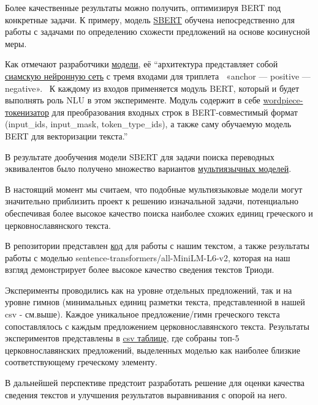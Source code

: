 \documentclass[
  letterpaper,
]{book}
\begin{document}
Более качественные результаты можно получить, оптимизируя BERT под
конкретные задачи. К примеру, модель
\href{https://arxiv.org/pdf/1908.10084.pdf}{SBERT} обучена
непосредственно для работы с задачами по определению схожести
предложений на основе косинусной меры.

Как отмечают разработчики
\href{https://habr.com/ru/companies/sberdevices/articles/527576/}{модели},
её ``архитектура представляет собой
\href{https://en.wikipedia.org/wiki/Siamese_neural_network}{сиамскую
нейронную сеть} с тремя входами для триплета~ «anchor --- positive ---
negative».~ К каждому из входов применяется модуль BERT, который и будет
выполнять роль NLU в этом эксперименте. Модуль содержит в себе
\href{https://paperswithcode.com/method/wordpiece}{wordpiece-токенизатор}
для преобразования входных строк в BERT-совместимый формат (input\_ids,
input\_mask, token\_type\_ids), а также саму обучаемую модель BERT для
векторизации текста.''

В результате дообучения модели SBERT для задачи поиска переводных
эквивалентов было получено множество вариантов
\href{https://huggingface.co/models?pipeline_tag=sentence-similarity\&sort=downloads\&search=multi}{мультиязычных
моделей}.

В настоящий момент мы считаем, что подобные мультиязыковые модели могут
значительно приблизить проект к решению изначальной задачи, потенциально
обеспечивая более высокое качество поиска наиболее схожих единиц
греческого и церковнославянского текста.

В репозитории представлен
\href{https://github.com/Drozhzhinastya/GSPC/blob/main/scripts/text-similarity/GSPC_sbert.ipynb}{код}
для работы с нашим текстом, а также результаты работы с моделью
sentence-transformers/all-MiniLM-L6-v2, которая на наш взгляд
демонстрирует более высокое качество сведения текстов Триоди.

Эксперименты проводились как на уровне отдельных предложений, так и на
уровне гимнов (минимальных единиц разметки текста, представленной в
нашей csv - см.выше). Каждое уникальное предложение/гимн греческого
текста сопоставлялось с каждым предложением церковнославянского текста.
Результаты экспериментов представлены в
\href{https://github.com/Drozhzhinastya/GSPC/tree/main/csv/sbert}{csv
таблице}, где собраны топ-5 церковнославянских предложений, выделенных
моделью как наиболее близкие соответствующему греческому элементу.

В дальнейшей перспективе предстоит разработать решение для оценки
качества сведения текстов и улучшения результатов выравнивания с опорой
на него.
\end{document}
